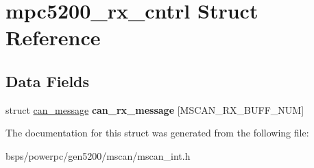 \hypertarget{structmpc5200__rx__cntrl}{}\section{mpc5200\+\_\+rx\+\_\+cntrl Struct Reference}
\label{structmpc5200__rx__cntrl}
\subsection*{Data Fields}
\begin{DoxyCompactItemize}
\item 
\mbox{\label{structmpc5200__rx__cntrl_a1a6778f640977bb4117eb5c428ac3fea}} 
struct \mbox{\hyperlink{unioncan__message}{can\+\_\+message}} {\bfseries can\+\_\+rx\+\_\+message} \mbox{[}M\+S\+C\+A\+N\+\_\+\+R\+X\+\_\+\+B\+U\+F\+F\+\_\+\+N\+UM\mbox{]}
\end{DoxyCompactItemize}


The documentation for this struct was generated from the following file\+:\begin{DoxyCompactItemize}
\item 
bsps/powerpc/gen5200/mscan/mscan\+\_\+int.\+h\end{DoxyCompactItemize}

